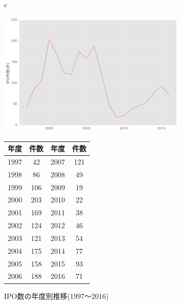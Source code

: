 \documentclass{jsarticle}
\begin{document}
\begin{figure}[h]
  \begin{center}
  \caption{IPO数の年度別推移(1997〜2016)}
  \begin{tabular}{c}
  \begin{minipage}{0.5\hsize}
  \begin{center}
    \includegraphics[clip,width=9cm]{./year_count.png}
     \end{center}
\end{minipage}
\begin{minipage}{0.5\hsize}
\begin{center}
    \label{fig:year}
\begin{tabular}{cc|cc}
		\hline
		年度 & 件数 & 年度 & 件数 \\
		\hline \hline
1997  &   42 & 2007  &  121\\
1998  &   86 & 2008   &  49\\
1999   & 106 & 2009  &   19\\
2000 &   203 & 2010  &   22\\
2001  &  169 & 2011   &  38\\
2002 &   124 & 2012  &   46\\
2003 &   121 & 2013 &    54\\
2004 &   175 & 2014   &  77\\
2005 &   158 & 2015  &   93\\
2006  &  188 & 2016 &    71\\
		\hline
	\end{tabular} 
	 \end{center}
	\end{minipage}
	  \end{tabular}
	    \end{center}
\end{figure}


\newpage
\end{document}
